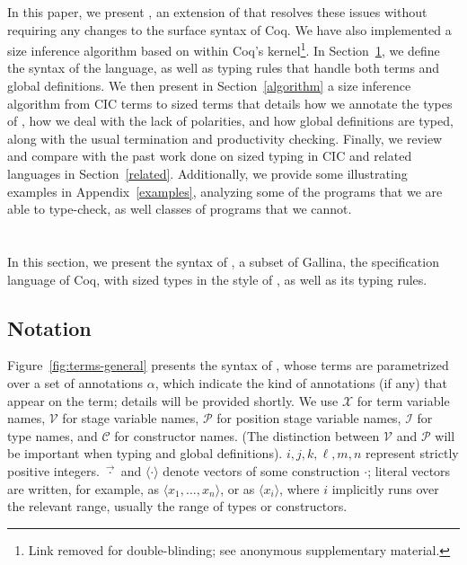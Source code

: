 \documentclass[sigplan,10pt,anonymous,review,nonacm]{acmart}
\begin{document}
In this paper, we present \lang, an extension of \CIChat \cite{cic-hat} that resolves these issues without requiring any changes to the surface syntax of Coq. We have also implemented a size inference algorithm based on \lang within Coq's kernel\footnote{
\iftrue
    Link removed for double-blinding; see anonymous supplementary material.
\else
    \url{https://github.com/ionathanch/coq/tree/dev}
\fi
}. In Section~\ref{typing}, we define the syntax of the language, as well as typing rules that handle both terms and global definitions. We then present in Section~\ref{algorithm} a size inference algorithm from CIC terms to sized \lang terms that details how we annotate the types of \cofixpoints, how we deal with the lack of polarities, and how global definitions are typed, along with the usual termination and productivity checking. Finally, we review and compare with the past work done on sized typing in CIC and related languages in Section~\ref{related}. Additionally, we provide some illustrating examples in Appendix~\ref{examples}, analyzing some of the programs that we are able to type-check, as well classes of programs that we cannot.

\section{\lang}\label{typing}
In this section, we present the syntax of \lang, a subset of Gallina, the specification language of Coq, with sized types in the style of \CIChat, as well as its typing rules.

\subsection{Notation}



Figure~\ref{fig:terms-general} presents the syntax of \lang, whose terms are parametrized over a set of annotations $\alpha$, which indicate the kind of annotations (if any) that appear on the term; details will be provided shortly. We use $\mathcal{X}$ for term variable names, $\mathcal{V}$ for stage variable names, $\mathcal{P}$ for position stage variable names, $\mathcal{I}$ for \coinductive type names, and $\mathcal{C}$ for \coinductive constructor names. (The distinction between $\mathcal{V}$ and $\mathcal{P}$ will be important when typing \cofixpoints and global definitions). $i, j, k, \ell, m, n$ represent strictly positive integers. $\vec{\cdot}$ and $\langle \cdot \rangle$ denote vectors of some construction $\cdot$; literal vectors are written, for example, as $\langle x_1, \dots, x_n \rangle$, or as $\langle x_i \rangle$, where $i$ implicitly runs over the relevant range, usually the range of \coinductive types or constructors. 
\end{document}

